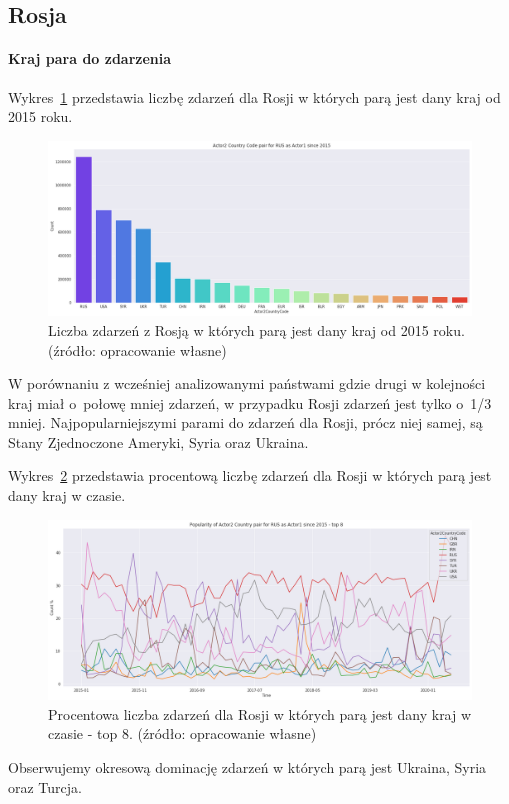 \documentclass[11pt]{report}
\begin{document}
    \subsection{Rosja}

    \paragraph{Kraj para do zdarzenia}

    Wykres~\ref{fig:RUSpair} przedstawia liczbę zdarzeń dla Rosji w których parą jest dany kraj od 2015 roku.

    \begin{figure}[!htp]
        \centering
        \includegraphics[width=\linewidth]{fig/RUS/RUSactor2Pair.png}
        \caption{Liczba zdarzeń z Rosją w których parą jest dany kraj od 2015 roku. (źródło: opracowanie własne)}
        \label{fig:RUSpair}
    \end{figure}
    W porównaniu z wcześniej analizowanymi państwami gdzie drugi w kolejności kraj miał o~połowę mniej zdarzeń, w przypadku Rosji zdarzeń jest tylko o~1/3 mniej.
    Najpopularniejszymi parami do zdarzeń dla Rosji, prócz niej samej, są Stany Zjednoczone Ameryki, Syria oraz Ukraina.

    Wykres~\ref{fig:RUSpairPerc} przedstawia procentową liczbę zdarzeń dla Rosji w których parą jest dany kraj w czasie.
    \begin{figure}[!htp]
        \centering
        \includegraphics[width=\linewidth]{fig/RUS/RUSactor2PairPercinTIME.png}
        \caption{Procentowa liczba zdarzeń dla Rosji w których parą jest dany kraj w czasie - top 8. (źródło: opracowanie własne)}
        \label{fig:RUSpairPerc}
    \end{figure}
    Obserwujemy okresową dominację zdarzeń w których parą jest Ukraina, Syria oraz Turcja.
\end{document}

